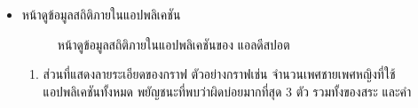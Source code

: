 \documentclass[12pt,oneside,openright,a4paper]{cpe-thai-project}
\begin{document}
\begin{itemize}
  \item หน้าดูข้อมูลสถิติภายในแอปพลิเคชัน
    \begin{figure}[!ht]\centering
      \setlength{\fboxrule}{0.2mm} %
      \setlength{\fboxsep}{1cm}
      \caption{หน้าดูข้อมูลสถิติภายในแอปพลิเคชันของ แอลดีสปอต}\label{fig:statapplication}
  \end{figure}
  \begin{enumerate}
    \item ส่วนที่แสดงลายระเอียดของกราฟ ตัวอย่างกราฟเช่น จำนวนเพศชายเพศหญิงที่ใช้แอปพลิเคชันทั้งหมด พยัญชนะที่พบว่าผิดบ่อยมากที่สุด 3 ตัว รวมทั้งของสระ และคำ
  \end{enumerate}
\end{itemize}
\newpage
\end{document}
